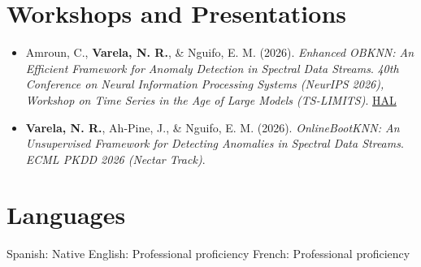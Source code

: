 \documentclass[12pt,a4paper]{article}
\begin{document}
\section*{Workshops and Presentations}
\begin{itemize}
\item Amroun, C., \textbf{Varela, N. R.}, \& Nguifo, E. M. (2026). \textit{Enhanced OBKNN: An Efficient Framework for Anomaly Detection in Spectral Data Streams}. \textit{40th Conference on Neural Information Processing Systems (NeurIPS 2026), Workshop on Time Series in the Age of Large Models (TS-LIMITS)}. \href{https://hal.science/hal-05803665/}{HAL}
\item \textbf{Varela, N. R.}, Ah-Pine, J., \& Nguifo, E. M. (2026). \textit{OnlineBootKNN: An Unsupervised Framework for Detecting Anomalies in Spectral Data Streams}. \textit{ECML PKDD 2026 (Nectar Track)}.
\end{itemize}

\section*{Languages}
Spanish: Native \textbar{} English: Professional proficiency \textbar{} French: Professional proficiency
\end{document}
